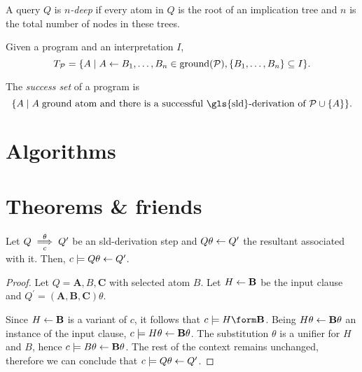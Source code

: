 \begin{dfn}[\(n\)-depth]
    A query \(Q\) is \emph{\(n\)-deep} if every atom in \(Q\) is the root of an implication tree and \(n\) is the total number of nodes in these trees.
\end{dfn}

\begin{dfn}[\(T_\prog\)]
    Given a program \prog and an interpretation \(I\),
    \begin{equation*}
        T_\mathcal{P} = \lbrace A \mid A \leftarrow B_1,\dotsc,B_n \in \operatorname{ground}(\mathcal{P}), \lbrace B_1,\dotsc,B_n \rbrace \subseteq I \rbrace.
    \end{equation*}
\end{dfn}

\begin{dfn}
    The \emph{success set} of a program \prog is
    \begin{equation*}
        \lbrace A \mid A\;\text{ground atom and there is a successful \gls{sld}-derivation of \(\prog \cup \lbrace A \rbrace\)}\rbrace.
    \end{equation*}
\end{dfn}
\section{Algorithms}

\section{Theorems \& friends}

\begin{lem}
    \label{decl:lem-1}
    Let \(Q \underset{c}{\overset{\theta}{\implies}} Q^\prime\) be an \gls{sld}-derivation step and \(Q\theta \leftarrow Q^\prime\) the resultant associated with it.
    Then, \(c \models Q\theta \leftarrow Q^\prime\).
\end{lem}
\begin{proof}
    Let \(Q = \mathbf{A}, B, \mathbf{C}\) with selected atom \(B\). Let \(H \leftarrow \mathbf{B}\) be the input clause and \(Q^\prime = (\mathbf{A},\mathbf{B},\mathbf{C})\theta\).

    Since \(H \leftarrow \mathbf{B}\) is a variant of \(c\), it follows that \(c \models H \form \mathbf{B}\).
    Being \(H\theta \leftarrow \mathbf{B}\theta\) an instance of the input clause, \(c \models H\theta \leftarrow \mathbf{B}\theta\).
    The substitution \(\theta\) is a unifier for \(H\) and \(B\), hence \(c \models B\theta \leftarrow \mathbf{B}\theta\).
    The rest of the context remains unchanged, therefore we can conclude that \(c \models Q\theta \leftarrow Q^\prime\).
\end{proof}

